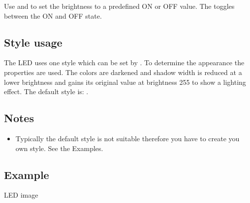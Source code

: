 \documentclass[letterpaper,10pt,english]{sphinxmanual}
\begin{document}
Use  and  to set the brightness to a predefined  ON or OFF value.  The  toggles between the ON and OFF state.


\subsection{Style usage}
\label{\detokenize{object-types/led:style-usage}}
The LED uses one style which can be set by . To determine the appearance the  properties are used. The colors are darkened and shadow width is reduced at a lower brightness and gains its original value at brightness 255 to show a lighting effect.  The default style is: .


\subsection{Notes}
\label{\detokenize{object-types/led:notes}}\begin{itemize}
\item {} 
Typically the default style is not suitable therefore you have to create you own style. See the Examples.

\end{itemize}


\subsection{Example}
\label{\detokenize{object-types/led:example}}
LED image
\end{document}
